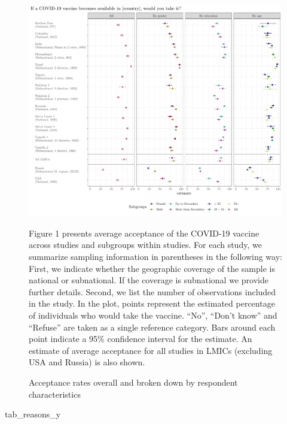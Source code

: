 \documentclass[
  12pt,
]{article}
\newenvironment{Shaded}{\begin{snugshade}}{\end{snugshade}}
\newcommand{\NormalTok}[1]{#1}
\begin{document}
\begin{figure}[!ht]
\caption{Acceptance rates overall and broken down by respondent characteristics \label{fig:mainfigure1}}

\includegraphics{paper_files/figure-latex/mainfigure1-1.pdf}

\scriptsize{Figure 1 presents average acceptance of the COVID-19 vaccine across studies and subgroups within studies. For each study, we summarize sampling information in parentheses in the following way: First, we indicate whether the geographic coverage of the sample is national or subnational. If the coverage is subnational we provide further details. Second, we list the number of observations included in the study. In the plot, points represent the estimated percentage of individuals who would take the vaccine. ``No'', ``Don't know'' and ``Refuse'' are taken as a single reference category. Bars around each point indicate a 95\% confidence interval for the estimate. An estimate of average acceptance for all studies in LMICs (excluding USA and Russia) is also shown.}
\end{figure}

\begin{Shaded}
\begin{Highlighting}[]
\NormalTok{tab\_reasons\_y}
\end{Highlighting}
\end{Shaded}
\end{document}
